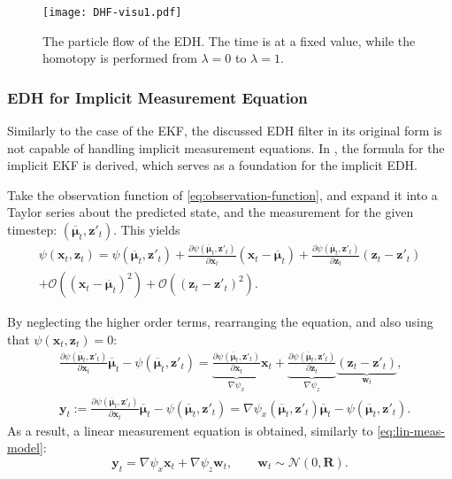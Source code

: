 \begin{figure}
  \centering
  \texttt{[image: DHF-visu1.pdf]}
  \caption{The particle flow of the EDH. The time is at a fixed value, while the homotopy is performed from $\lambda = 0$ to $\lambda = 1$.}
  \label{fig:dhf-ill}
\end{figure}

\subsubsection{EDH for Implicit Measurement Equation}

Similarly to the case of the EKF, the discussed EDH filter in its original form is not capable of
handling implicit measurement equations.
In \cite{Zhang2012}, the formula for the implicit EKF is derived,
which serves as a foundation for the implicit EDH.

Take the observation function of \eqref{eq:observation-function},
and expand it into a Taylor series about the predicted state, and the measurement for the given timestep: $\left(\overline{\boldsymbol\mu}_t,\mathbf{z}'_t\right)$. This yields
\begin{align}
  \psi(\mathbf{x}_t,\mathbf{z}_t) = \psi(\overline{\boldsymbol\mu}_t,\mathbf{z}'_t)
  + \frac{\partial \psi(\overline{\boldsymbol\mu}_t,\mathbf{z}'_t)}{\partial \mathbf{x}_t}(\mathbf{x}_t-\overline{\boldsymbol\mu}_t)
  + \frac{\partial \psi(\overline{\boldsymbol\mu}_t,\mathbf{z}'_t)}{\partial \mathbf{z}_t}(\mathbf{z}_t-\mathbf{z}'_t) \\
  + \mathcal{O}((\mathbf{x}_t-\overline{\boldsymbol\mu}_t)^2)
  + \mathcal{O}((\mathbf{z}_t-\mathbf{z}'_t)^2) \nonumber.
\end{align}

By neglecting the higher order terms, rearranging the equation, and also using that \linebreak
$\psi(\mathbf{x}_t,\mathbf{z}_t) = 0$:
\begin{align}
   & \frac{\partial \psi(\overline{\boldsymbol\mu}_t,\mathbf{z}'_t)}{\partial \mathbf{x}_t}\overline{\boldsymbol\mu}_t
  - \psi(\overline{\boldsymbol\mu}_t,\mathbf{z}'_t) = \underbrace{\frac{\partial \psi(\overline{\boldsymbol\mu}_t,\mathbf{z}'_t)}{\partial \mathbf{x}_t}}_{\nabla \psi_x}\mathbf{x}_t + \underbrace{\frac{\partial \psi(\overline{\boldsymbol\mu}_t,\mathbf{z}'_t)}{\partial \mathbf{z}_t}}_{\nabla \psi_z}\underbrace{(\mathbf{z}_t-\mathbf{z}'_t)}_{\mathbf{w}_t}, \\
   & \mathbf{y}_t :=  \frac{\partial \psi(\overline{\boldsymbol\mu}_t,\mathbf{z}'_t)}{\partial \mathbf{x}_t}\overline{\boldsymbol\mu}_t
  - \psi(\overline{\boldsymbol\mu}_t,\mathbf{z}'_t) = \nabla\psi_x(\overline{\boldsymbol\mu}_t,\mathbf{z}'_t)\overline{\boldsymbol\mu}_t-\psi(\overline{\boldsymbol\mu}_t,\mathbf{z}'_t) \label{eq:edh-implicit-y}.
\end{align}
As a result, a linear measurement equation is obtained, similarly to \eqref{eq:lin-meas-model}:
\begin{equation}
  \mathbf{y}_t = \nabla \psi_x \mathbf{x}_t + \nabla \psi_z\mathbf{w}_t,\quad\quad \mathbf{w}_t \sim \mathcal{N}(0,\mathbf{R}).
\end{equation}

